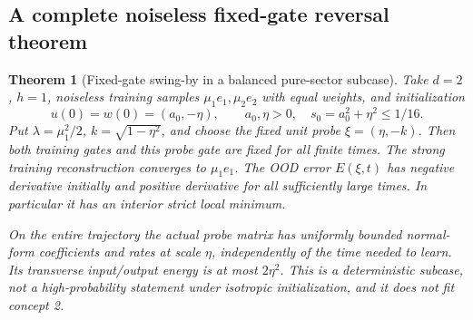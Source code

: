 \documentclass{article} %
\theoremstyle{plain}
\newtheorem{theorem}{Theorem}[section]
\theoremstyle{definition}
\theoremstyle{remark}
\begin{document}
\subsection{A complete noiseless fixed-gate reversal theorem}
\begin{theorem}[Fixed-gate swing-by in a balanced pure-sector subcase]
\label{sbsign:exact-reversal}
Take $d=2$, $h=1$, noiseless training samples $\mu_1 e_1,\mu_2 e_2$
with equal weights, and initialization
\[
 u(0)=w(0)=(a_0,-\eta),\qquad
 a_0,\eta>0,\quad s_0=a_0^2+\eta^2\le1/16.
\]
Put $\lambda=\mu_1^2/2$, $k=\sqrt{1-\eta^2}$, and choose the fixed
unit probe $\xi=(\eta,-k)$. Then both training gates and this probe gate
are fixed for all finite times. The strong training reconstruction
converges to $\mu_1e_1$. The OOD error $E(\xi,t)$ has negative derivative
initially and positive derivative for all sufficiently large times.
In particular it has an interior strict local minimum.

On the entire trajectory the actual probe matrix has uniformly bounded
normal-form coefficients and rates at scale $\eta$, independently of
the time needed to learn. Its transverse input/output energy is at most
$2\eta^2$. This is a deterministic subcase, not a high-probability
statement under isotropic initialization, and it does not fit concept 2.
\end{theorem}
\end{document}
